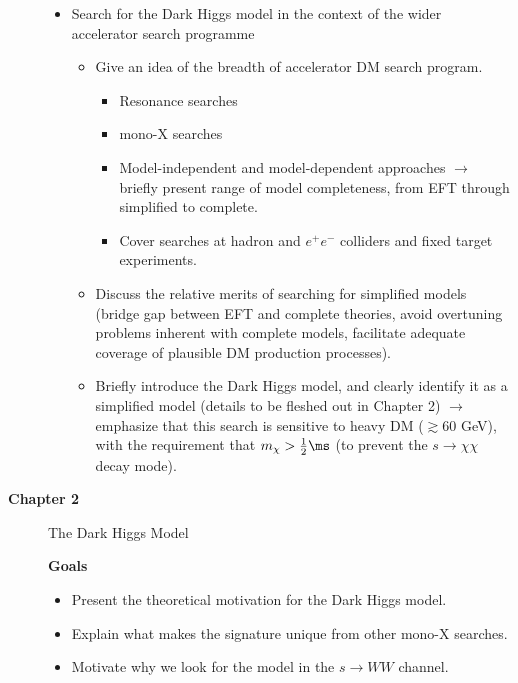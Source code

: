 \begin{description}
\begin{itemize}
\item Search for the Dark Higgs model in the context of the wider accelerator search programme
\begin{itemize}
\item Give an idea of the breadth of accelerator DM search program.
\begin{itemize}
\item Resonance searches
\item mono-X searches
\item Model-independent and model-dependent approaches $\rightarrow$ briefly present range of model completeness, from EFT through simplified to complete.
\item Cover searches at hadron and $e^+e^-$ colliders and fixed target experiments.
\end{itemize}
\item Discuss the relative merits of searching for simplified models (bridge gap between EFT and complete theories, avoid overtuning problems inherent with complete models, facilitate adequate coverage of plausible DM production processes).
\item Briefly introduce the Dark Higgs model, and clearly identify it as a simplified model (details to be fleshed out in Chapter 2) $\rightarrow$ emphasize that this search is sensitive to heavy DM ($\gtrsim$60 GeV), with the requirement that $m_\chi>\frac{1}{2}\ms$ (to prevent the $s\rightarrow\chi\chi$ decay mode).
\end{itemize}

\end{itemize}
\item[\textbf{Chapter 2}] The Dark Higgs Model

\textbf{Goals}
\begin{itemize}
\item Present the theoretical motivation for the Dark Higgs model.
\item Explain what makes the signature unique from other mono-X searches.
\item Motivate why we look for the model in the $s\rightarrow WW$ channel.
\end{itemize}


\end{description}
